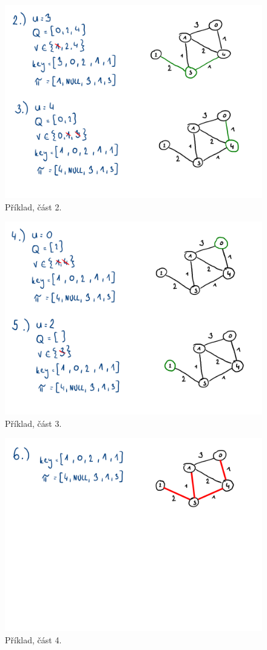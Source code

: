 \begin{figure}[H]
    \centering
    \includegraphics[width=0.9\linewidth]{03-minimalni-kostry-17.pdf}
    \caption{Příklad, část 2.}
\end{figure}

\begin{figure}[H]
    \centering
    \includegraphics[width=0.9\linewidth]{03-minimalni-kostry-18.pdf}
    \caption{Příklad, část 3.}
\end{figure}

\begin{figure}[H]
    \centering
    \includegraphics[width=0.9\linewidth]{03-minimalni-kostry-19.pdf}
    \caption{Příklad, část 4.}
\end{figure}
